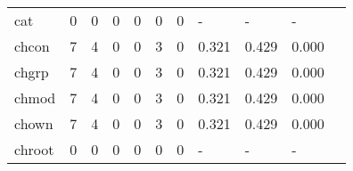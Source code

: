 \begin{longtable}{lp{1.2cm}p{1.2cm}p{1.2cm}p{1.2cm}p{1.2cm}p{1.2cm}p{1.2cm}p{1.2cm}p{1.2cm}p{1.2cm}}
cat       &                                     0 &                                                  0 &                                                0 &                                               0 &                                                0 &                                              0 &                                                  - &                                                  - &                                                  - \\
chcon     &                                     7 &                                                  4 &                                                0 &                                               0 &                                                3 &                                              0 &                                              0.321 &                                              0.429 &                                              0.000 \\
chgrp     &                                     7 &                                                  4 &                                                0 &                                               0 &                                                3 &                                              0 &                                              0.321 &                                              0.429 &                                              0.000 \\
chmod     &                                     7 &                                                  4 &                                                0 &                                               0 &                                                3 &                                              0 &                                              0.321 &                                              0.429 &                                              0.000 \\
chown     &                                     7 &                                                  4 &                                                0 &                                               0 &                                                3 &                                              0 &                                              0.321 &                                              0.429 &                                              0.000 \\
chroot    &                                     0 &                                                  0 &                                                0 &                                               0 &                                                0 &                                              0 &                                                  - &                                                  - &                                                  - \\

\end{longtable}
